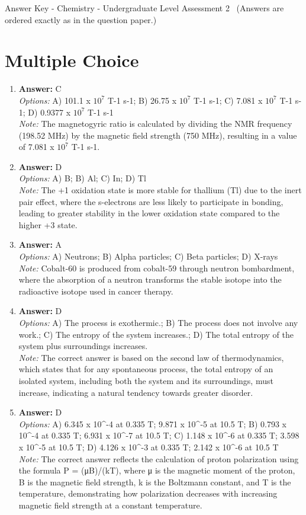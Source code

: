 \documentclass[12pt]{article}
\begin{document}
\begin{center}
Answer Key - Chemistry - Undergraduate Level Assessment 2 \
\small (Answers are ordered exactly as in the question paper.)
\end{center}

\section*{Multiple Choice}
\begin{enumerate}[label=\arabic*.]
\item \textbf{Answer:} C
\\ \textit{Options:} A) 101.1 x $10^7$ T-1 s-1; B) 26.75 x $10^7$ T-1 s-1; C) 7.081 x $10^7$ T-1 s-1; D) 0.9377 x $10^7$ T-1 s-1
\\ \textit{Note:} The magnetogyric ratio is calculated by dividing the NMR frequency (198.52 MHz) by the magnetic field strength (750 MHz), resulting in a value of 7.081 x $10^7$ T-1 s-1.
\item \textbf{Answer:} D
\\ \textit{Options:} A) B; B) Al; C) In; D) Tl
\\ \textit{Note:} The +1 oxidation state is more stable for thallium (Tl) due to the inert pair effect, where the s-electrons are less likely to participate in bonding, leading to greater stability in the lower oxidation state compared to the higher +3 state.
\item \textbf{Answer:} A
\\ \textit{Options:} A) Neutrons; B) Alpha particles; C) Beta particles; D) X-rays
\\ \textit{Note:} Cobalt-60 is produced from cobalt-59 through neutron bombardment, where the absorption of a neutron transforms the stable isotope into the radioactive isotope used in cancer therapy.
\item \textbf{Answer:} D
\\ \textit{Options:} A) The process is exothermic.; B) The process does not involve any work.; C) The entropy of the system increases.; D) The total entropy of the system plus surroundings increases.
\\ \textit{Note:} The correct answer is based on the second law of thermodynamics, which states that for any spontaneous process, the total entropy of an isolated system, including both the system and its surroundings, must increase, indicating a natural tendency towards greater disorder.
\item \textbf{Answer:} D
\\ \textit{Options:} A) 6.345 x 10^-4 at 0.335 T; 9.871 x 10^-5 at 10.5 T; B) 0.793 x 10^-4 at 0.335 T; 6.931 x 10^-7 at 10.5 T; C) 1.148 x 10^-6 at 0.335 T; 3.598 x 10^-5 at 10.5 T; D) 4.126 x 10^-3 at 0.335 T; 2.142 x 10^-6 at 10.5 T
\\ \textit{Note:} The correct answer reflects the calculation of proton polarization using the formula P = (μB)/(kT), where μ is the magnetic moment of the proton, B is the magnetic field strength, k is the Boltzmann constant, and T is the temperature, demonstrating how polarization decreases with increasing magnetic field strength at a constant temperature.
\end{enumerate}
\end{document}

